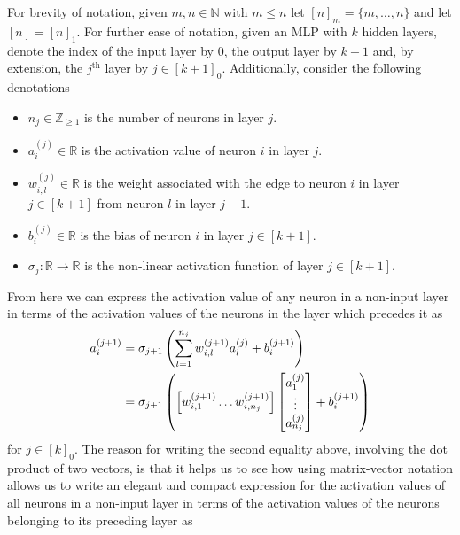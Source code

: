 \documentclass[11pt]{article}
\begin{document}
For brevity of notation, given $m,n\in\mathbb{N}$ with $m\leq n$ let $[n]_m=\{m,\dots,n\}$ and let $[n]=[n]_1$. For further ease of notation, given an MLP with $k$ hidden layers, denote the index of the input layer by $0$, the output layer by $k+1$ and, by extension, the $j^{\text{th}}$ layer by $j\in[k+1]_0$. Additionally, consider the following denotations
\begin{itemize}
    \item[--] $n_j\in\mathbb{Z}_{\geq1}$ is the number of neurons in layer $j$.
    \item[--] $a_i^{(j)}\in\mathbb{R}$ is the activation value of neuron $i$ in layer $j$.
    \item[--] $w_{i,l}^{(j)}\in\mathbb{R}$ is the weight associated with the edge to neuron $i$ in layer $j\in[k+1]$ from neuron $l$ in layer $j-1$.
    \item[--] $b_i^{(j)}\in\mathbb{R}$ is the bias of neuron $i$ in layer $j\in[k+1]$.
    \item[--] $\sigma_j:\mathbb{R}\rightarrow\mathbb{R}$ is the non-linear activation function of layer $j\in[k+1]$.
\end{itemize}
From here we can express the activation value of any neuron in a non-input layer in terms of the activation values of the neurons in the layer which precedes it as
\begin{align*}
    a_i^{(j+1)}
    &=
    \sigma_{j+1}\left(
    \sum_{l=1}^{n_j} w_{i,l}^{(j+1)}a_l^{(j)} + b_i^{(j+1)}
    \right)\\
    &=
    \sigma_{j+1}\left(
    \left[w_{i,1}^{(j+1)} \dots w_{i,n_j}^{(j+1)}\right]
    \begin{bmatrix}
        a_1^{(j)}\\
        \vdots\\
        a_{n_j}^{(j)}
    \end{bmatrix}
    +
    b_i^{(j+1)}
\right)
\end{align*}
for $j\in[k]_0$. The reason for writing the second equality above, involving the dot product of two vectors, is that it helps us to see how using matrix-vector notation allows us to write an elegant and compact expression for the activation values of all neurons in a non-input layer in terms of the activation values of the neurons belonging to its preceding layer as
\end{document}
